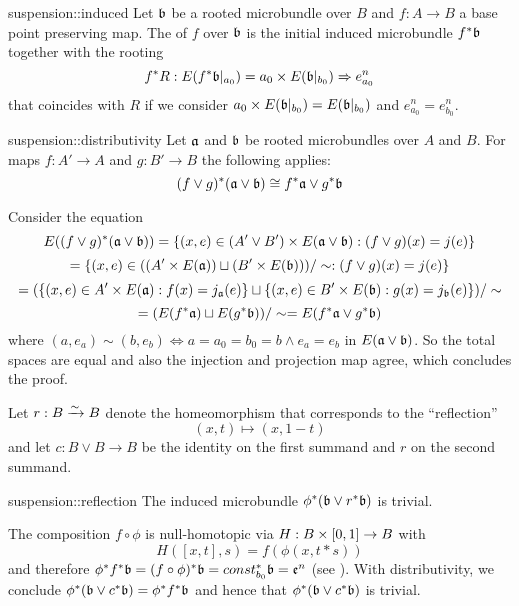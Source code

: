 \begin{mydefinition}{suspension::induced}
    Let $\mathfrak{b}$ be a rooted microbundle over $B$ and $f: A \to B$ a base point preserving map.
    The  of $f$ over $\mathfrak{b}$ is the initial induced microbundle $f^*\mathfrak{b}$ together with the rooting
    \[ f^*R: E(f^*\mathfrak{b}\vert_{a_0}) = a_0 \times E(\mathfrak{b}\vert_{b_0}) \Rightarrow{} e^n_{a_0} \]
    that coincides with $R$ if we consider $a_0 \times E(\mathfrak{b}\vert_{b_0}) = E(\mathfrak{b}\vert_{b_0})$ and $e^n_{a_0} = e^n_{b_0}$.
\end{mydefinition}

\begin{mylemma}{suspension::distributivity}
    Let $\mathfrak{a}$ and $\mathfrak{b}$ be rooted microbundles over $A$ and $B$.
    For maps $f: A' \to A$ and $g: B' \to B$ the following applies:
    \[ (f \vee g)^*(\mathfrak{a} \vee \mathfrak{b}) \cong f^*\mathfrak{a} \vee g^*\mathfrak{b} \]
\end{mylemma}
\begin{myproof}
    Consider the equation
    \[ E((f \vee g)^*(\mathfrak{a} \vee \mathfrak{b})) = \{(x, e) \in (A' \vee B') \times E(\mathfrak{a} \vee \mathfrak{b}):(f \vee g)(x) = j(e)\} \]
    \[ = \{(x, e) \in ((A' \times E(\mathfrak{a})) \sqcup (B' \times E(\mathfrak{b}))) / \sim:(f \vee g)(x) = j(e)\} \]
    \[ = (\{(x, e) \in A' \times E(\mathfrak{a}):f(x) = j_{\mathfrak{a}}(e)\} \sqcup \{(x, e) \in B' \times E(\mathfrak{b}):g(x) = j_{\mathfrak{b}}(e)\}) / \sim \]
    \[ = (E(f^*\mathfrak{a}) \sqcup E(g^*\mathfrak{b})) / \sim = E(f^*\mathfrak{a} \vee g^*\mathfrak{b})\]
    where $(a, e_a) \sim (b, e_b) \iff a = a_0 = b_0 = b \land e_a = e_b$ in $E(\mathfrak{a} \vee \mathfrak{b})$.
    So the total spaces are equal and also the injection and projection map agree, which concludes the proof.
\end{myproof}

\begin{myparagraph}
    Let $r: B \xrightarrow{\sim} B$ denote the homeomorphism that corresponds to the ``reflection''
    \[ (x, t) \mapsto (x, 1 - t)\]
    and let $c: B \vee B \to B$ be the identity on the first summand and $r$ on the second summand.
\end{myparagraph}
\begin{mylemma}{suspension::reflection}
    The induced microbundle $\phi^*(\mathfrak{b} \vee r^*\mathfrak{b})$ is trivial.
\end{mylemma}
\begin{myproof}
    The composition $f \circ \phi$ is null-homotopic via $H: B \times [0, 1] \to B$ with
    \[ H([x, t], s) = f(\phi(x, t * s)) \]
    and therefore $\phi^*f^*\mathfrak{b} = (f \circ \phi)^*\mathfrak{b} = const_{b_0}^*\mathfrak{b} = \mathfrak{e}^{n}$ (see ).
    With distributivity, we conclude $\phi^*(\mathfrak{b} \vee c^*\mathfrak{b}) = \phi^*f^*\mathfrak{b}$ and hence that $\phi^*(\mathfrak{b} \vee c^*\mathfrak{b})$ is trivial.
\end{myproof}

